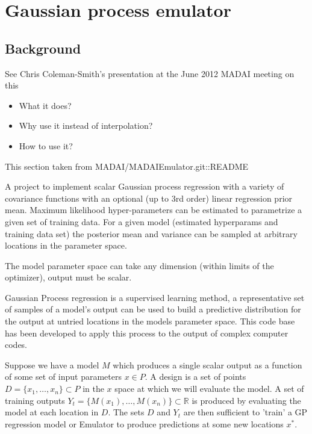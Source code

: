 \documentclass{article}
\begin{document}
\section{Gaussian process emulator}

\subsection{Background}

See Chris Coleman-Smith's presentation at the June 2012 MADAI meeting on this

\begin{itemize}

\item What it does?

\item Why use it instead of interpolation?

\item How to use it?

\end{itemize}

{\raggedleft
\textsf{This section taken from MADAI/MADAIEmulator.git::README}

}

A project to implement scalar Gaussian process regression with a
variety of covariance functions with an optional (up to 3rd order)
linear regression prior mean. Maximum likelihood hyper-parameters can
be estimated to parametrize a given set of training data. For a given
model (estimated hyperparams and training data set) the posterior mean
and variance can be sampled at arbitrary locations in the parameter
space.

The model parameter space can take any dimension (within limits of the
optimizer), output must be scalar.

Gaussian Process regression is a supervised learning method, a
representative set of samples of a model's output can be used to build
a predictive distribution for the output at untried locations in the
models parameter space. This code base has been developed to apply
this process to the output of complex computer codes.

Suppose we have a model $M$ which produces a single scalar output as a
function of some set of input parameters $x∈P$. A design is a set of
points $D = \{x_1, …, x_n\}⊂P$ in the $x$ space at which we will evaluate
the model. A set of training outputs $Y_t = \{M(x_1), …, M(x_n)\} ⊂ ℝ$ is
produced by evaluating the model at each location in $D$. The sets $D$ and
$Y_t$ are then sufficient to 'train' a GP regression model or Emulator
to produce predictions at some new locations $x^*$.
\end{document}
